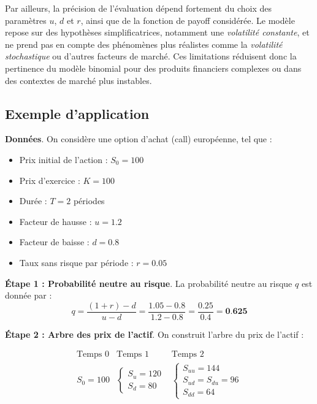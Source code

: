\documentclass[12pt,a4paper]{article}
\begin{document}
Par ailleurs, la précision de l’évaluation dépend fortement du choix des paramètres \(u\), \(d\) et \(r\), ainsi que de la fonction de payoff considérée. Le modèle repose sur des hypothèses simplificatrices, notamment une \textit{volatilité constante}, et ne prend pas en compte des phénomènes plus réalistes comme la \textit{volatilité stochastique} ou d’autres facteurs de marché. Ces limitations réduisent donc la pertinence du modèle binomial pour des produits financiers complexes ou dans des contextes de marché plus instables.

\subsection{Exemple d'application}
\noindent \textbf{Données}. On considère une option d’achat (call) européenne, tel que :

\begin{itemize}
    \item Prix initial de l’action : $S_0 = 100$
    \item Prix d’exercice : $K = 100$
    \item Durée : $T = 2$ périodes
    \item Facteur de hausse : $u = 1.2$
    \item Facteur de baisse : $d = 0.8$
    \item Taux sans risque par période : $r = 0.05$
\end{itemize}

\noindent \textbf{Étape 1 : Probabilité neutre au risque}. La probabilité neutre au risque $q$ est donnée par :
\[
q = \frac{(1 + r) - d}{u - d} = \frac{1.05 - 0.8}{1.2 - 0.8} = \frac{0.25}{0.4} = \textbf{0.625}
\]

\noindent \textbf{Étape 2 : Arbre des prix de l’actif}. On construit l’arbre du prix de l’actif :

\[
\begin{array}{ccc}
\text{Temps 0} & \text{Temps 1} & \text{Temps 2} \\
S_0 = 100 & \begin{cases}
S_u = 120 \\
S_d = 80
\end{cases}
&
\begin{cases}
S_{uu} = 144 \\
S_{ud} = S_{du} = 96 \\
S_{dd} = 64
\end{cases}
\end{array}
\]
\end{document}
